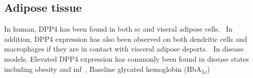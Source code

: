 \subsection{Adipose tissue}
In human, DPP4 has been found in both sc and viseral adipose cells.~\cite{Lamers2011} In addition, DPP4 expression has also been observed on both dendritic cells and macrophages if they are in contact with visceral adipose deports.~\cite{Zhong2013} In disease models, Elevated DPP4 expression has commonly been found in disease states including obesity and inf~\cite{Zhong2013},  Baseline glycated hemoglobin (HbA\textsubscript{1c}) 